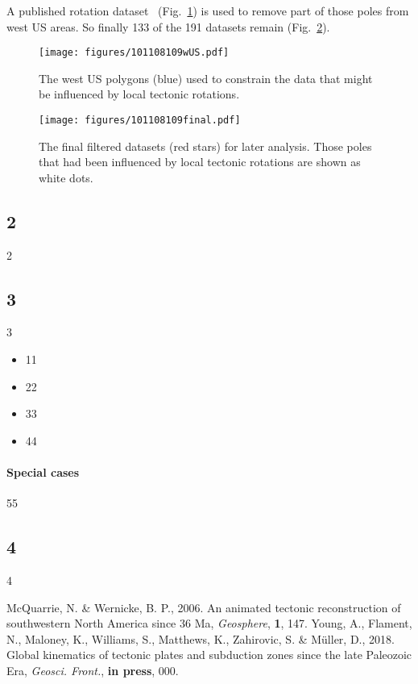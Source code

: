 A published rotation dataset~\cite{Mc06} (Fig.~\ref{fig_NAwUS}) is used to
remove part of those poles from west US areas. So finally 133 of the 191
datasets remain (Fig.~\ref{fig_NAfinal}).

\begin{figure}
\texttt{[image: figures/101108109wUS.pdf]}
\caption{The west US polygons (blue) used to constrain the data that might be
  influenced by local tectonic rotations.}\label{fig_NAwUS}
\end{figure}

\begin{figure}
\texttt{[image: figures/101108109final.pdf]}
\caption{The final filtered datasets (red stars) for later analysis. Those
poles that had been influenced by local tectonic rotations are shown as white
dots.}\label{fig_NAfinal}
\end{figure}

\subsection{2}
2

\subsection{3}
3

\begin{itemize}
\item 11
\item 22
\item 33
\item 44
\end{itemize}

\paragraph{Special cases} 55

\subsection{4}
4

\begin{thebibliography}{}
  McQuarrie, N. \& Wernicke, B. P., 2006. An animated tectonic reconstruction of
  southwestern North America since 36 Ma, \textit{Geosphere}, \textbf{1},
  147.
  Young, A., Flament, N., Maloney, K., Williams, S., Matthews, K., Zahirovic,
  S.
  \& Müller, D., 2018. Global kinematics of tectonic plates and subduction zones
  since the late Paleozoic Era, \textit{Geosci. Front.},
  \textbf{in press}, 000.
\end{thebibliography}\label{lastpage}
